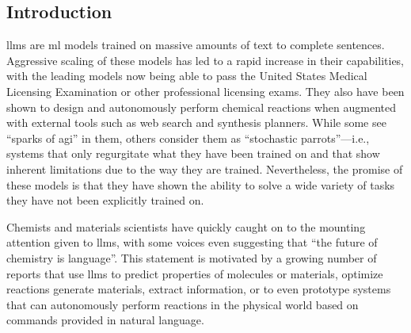 \documentclass[11pt, oneside]{article}
\begin{document}
\clearpage
\begin{refsection}
\section{Introduction}
\Glspl{llm} are \gls{ml} models trained on massive amounts of text to complete sentences.
Aggressive scaling of these models has led to a rapid increase in their capabilities,\autocite{brown2020language,zhong2024benchmarking} with the leading models now being able to pass the United States Medical Licensing Examination\autocite{kung2023performance} or other professional licensing exams.
They also have been shown to design and autonomously perform chemical reactions when augmented with external tools such as web search and synthesis planners.\autocite{openai2024gpt4, Boiko_2023, bran2023chemcrow, darvish2024organa}
While some see \enquote{sparks of \gls{agi}} in them,\autocite{bubeck2023sparks} others consider them as \enquote{stochastic parrots}---i.e., systems that only regurgitate what they have been trained on\autocite{bender2021dangers} and that show inherent limitations due to the way they are trained.\autocite{mccoy2023embersautoregressionunderstandinglarge}
Nevertheless, the promise of these models is that they have shown the ability to solve a wide variety of tasks they have not been explicitly trained on.\autocite{bommasani2021opportunities, anderljung2023frontier, ai4science2023impact}

Chemists and materials scientists have quickly caught on to the mounting attention given to \glspl{llm}, with some voices even suggesting that \enquote{the future of chemistry is language}.\autocite{White_2023}
This statement is motivated by a growing number of reports that use \glspl{llm} to predict properties of molecules or materials,\autocite{jablonka202314, jablonka2024leveraging, xie2024fine, liao2024words, zhang2024chemllm, zhong2024benchmarking}  optimize reactions\autocite{ramos2023bayesian, kristiadi2024sober}  generate materials,\autocite{rubungo2023llm, flam2023language, gruver2024fine, alampara2024mattextlanguagemodelsneed} extract information,\autocite{Patiny_2023, Dagdelen_2024, Zheng_2024, lala2023paperqa, caufield2023structured, gupta2022discomat, schillingwilhelmi2024textinsightlargelanguage, skarlinski2024language} or to even prototype systems that can autonomously perform reactions in the physical world based on commands provided in natural language.\autocite{bran2023chemcrow, Boiko_2023, darvish2024organa}


\end{refsection}
\end{document}
